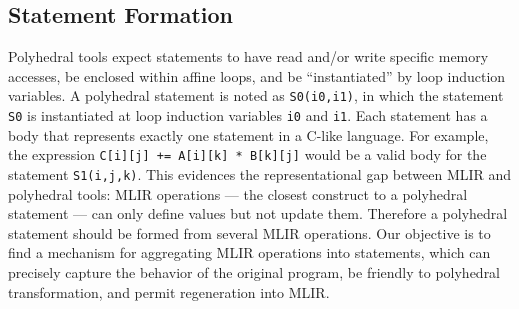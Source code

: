 \documentclass[sigplan]{acmart}
\newcommand{\icode}[1]{{\texttt {#1}}}
\newcommand{\scop}{SCoP\xspace}
\begin{document}

\subsection{Statement Formation}
\label{sec:scop}
Polyhedral tools expect statements to have read and/or write specific memory accesses, be enclosed within affine loops, and be ``instantiated'' by loop induction variables.
A polyhedral statement is noted as \icode{S0(i0,i1)}, in which the statement \icode{S0} is instantiated at loop induction variables \icode{i0} and \icode{i1}.
Each statement has a body that represents exactly one statement in a C-like language. For example, the expression \icode{C[i][j] += A[i][k] * B[k][j]} would be a valid body for the statement \icode{S1(i,j,k)}. 
This evidences the representational gap between MLIR and polyhedral tools: MLIR operations --- the closest construct to a polyhedral statement --- can only define values but not update them.
Therefore a polyhedral statement should be formed from several MLIR operations.
Our objective is to find a mechanism for aggregating MLIR operations into statements, which can precisely capture the behavior of the original program, be friendly to polyhedral transformation, and permit regeneration into MLIR.



\end{document}
